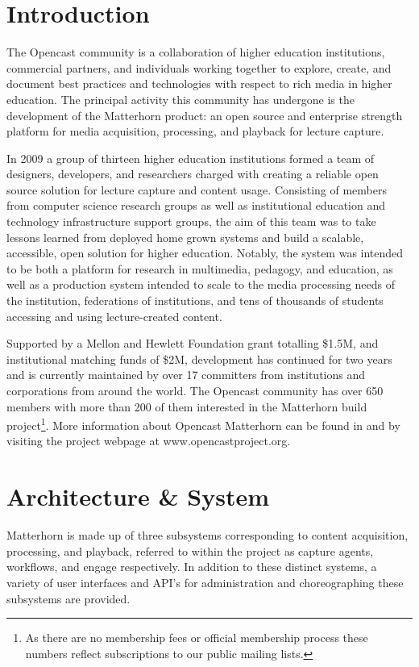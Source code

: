 \documentclass[letterpaper]{sig-alternate}
\begin{document}

\section{Introduction}
The Opencast community is a collaboration of higher education institutions, commercial partners, and individuals working together to explore, create, and document best practices and technologies with respect to rich media in higher education.  The principal activity this community has undergone is the development of the Matterhorn product: an open source and enterprise strength platform for media acquisition, processing, and playback for lecture capture.

In 2009 a group of thirteen higher education institutions formed a team of designers, developers, and researchers charged with creating a reliable open source solution for lecture capture and content usage.  Consisting of members from computer science research groups as well as institutional education and technology infrastructure support groups, the aim of this team was to take lessons learned from deployed home grown systems and build a scalable, accessible, open solution for higher education.  Notably, the system was intended to be both a platform for research in multimedia, pedagogy, and education, as well as a production system intended to scale to the media processing needs of the institution, federations of institutions, and tens of thousands of students accessing and using lecture-created content.

Supported by a Mellon and Hewlett Foundation grant totalling \$1.5M, and institutional matching funds of \$2M, development has continued for two years and is currently maintained by over 17 committers from institutions and corporations from around the world.  The Opencast community has over 650 members with more than 200 of them interested in the Matterhorn build project\footnote{As there are no membership fees or official membership process these numbers reflect subscriptions to our public mailing lists.}. More information about Opencast Matterhorn can be found in \cite{DBLP:journals/itse/KetterlSH10} and by visiting the project webpage at www.opencastproject.org. 

\section{Architecture \& System}
Matterhorn is made up of three subsystems corresponding to content acquisition, processing, and playback, referred to within the project as capture agents, workflows, and engage respectively.  In addition to these distinct systems, a variety of user interfaces and API's for administration and choreographing these subsystems are provided.  
\end{document}
